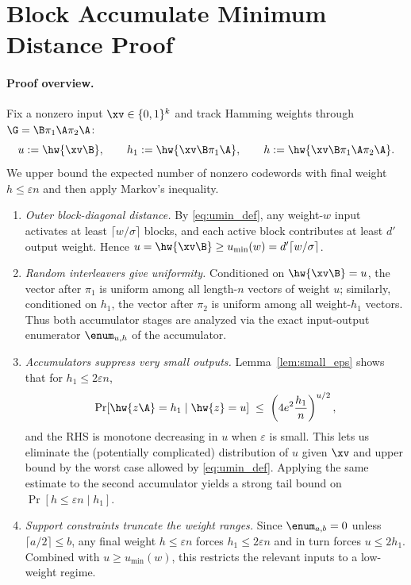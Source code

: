 \section{Block Accumulate Minimum Distance Proof}\label{sec:BAProofApd}



\if{}
\else
\paragraph{Proof overview.}
Fix a nonzero input $\xv\in\{0,1\}^k$ and track Hamming weights through
$\G=\B\pi_1\A\pi_2\A$:
\[
u:=\hw{\xv\B},\qquad
h_1:=\hw{\xv\B\pi_1\A},\qquad
h:=\hw{\xv\B\pi_1\A\pi_2\A}.
\]
We upper bound the expected number of nonzero codewords with final weight
$h\le \varepsilon n$ and then apply Markov's inequality.
\begin{enumerate}
\item \emph{Outer block-diagonal distance.}
  By \eqref{eq:umin_def}, any weight-$w$ input activates at least
  $\lceil w/\sigma\rceil$ blocks, and each active block contributes at least $d'$
  output weight. Hence
  $u=\hw{\xv\B}\ge u_{\min}(w)=d'\lceil w/\sigma\rceil$.

\item  \emph{Random interleavers give uniformity.}
  Conditioned on $\hw{\xv\B}=u$, the vector after $\pi_1$ is uniform among all
  length-$n$ vectors of weight $u$; similarly, conditioned on $h_1$, the vector
  after $\pi_2$ is uniform among all weight-$h_1$ vectors. Thus both accumulator
  stages are analyzed via the exact input-output enumerator $\enum_{u,h}$ of the accumulator.

\item  \emph{Accumulators suppress very small outputs.}
  Lemma~\ref{lem:small_eps} shows that for $h_1\le 2\varepsilon n$,
  \[
  \Pr[\hw{z\A}=h_1\mid \hw{z}=u]\;\le\;\left(4e^2\frac{h_1}{n}\right)^{u/2},
  \]
  and the RHS is monotone decreasing in $u$ when $\varepsilon$ is small. This
  lets us eliminate the (potentially complicated) distribution of $u$ given
  $\xv$ and upper bound by the worst case allowed by \eqref{eq:umin_def}.
  Applying the same estimate to the second accumulator yields a strong tail bound
  on $\Pr[h\le \varepsilon n\mid h_1]$.

\item \emph{Support constraints truncate the weight ranges.}
  Since $\enum_{a,b}=0$ unless $\lceil a/2\rceil\le b$, any final weight
  $h\le \varepsilon n$ forces $h_1\le 2\varepsilon n$ and in turn forces
  $u\le 2h_1$. Combined with $u\ge u_{\min}(w)$, this restricts the relevant
  inputs to a low-weight regime.


\end{enumerate}
